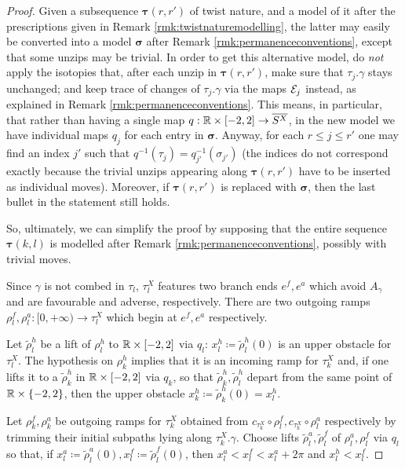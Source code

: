 \begin{proof}
Given a subsequence $\bm\tau(r,r')$ of twist nature, and a model of it after the prescriptions given in Remark \ref{rmk:twistnaturemodelling}, the latter may easily be converted into a model $\bm\sigma$ after Remark \ref{rmk:permanenceconventions}, except that some unzips may be trivial. In order to get this alternative model, do \emph{not} apply the isotopies that, after each unzip in $\bm\tau(r,r')$, make sure that $\tau_j.\gamma$ stays unchanged; and keep trace of changes of $\tau_j.\gamma$ via the maps $\mathcal{E}_j$ instead, as explained in Remark \ref{rmk:permanenceconventions}. This means, in particular, that rather than having a single map $q:\mathbb R\times[-2,2]\rightarrow \overline{S^X}$, in the new model we have individual maps $q_j$ for each entry in $\bm\sigma$. Anyway, for each $r\leq j\leq r'$ one may find an index $j'$ such that $q^{-1}(\tau_j)=q_{j'}^{-1}(\sigma_{j'})$ (the indices do not correspond exactly because the trivial unzips appearing along $\bm\tau(r,r')$ have to be inserted as individual moves). Moreover, if $\bm\tau(r,r')$ is replaced with $\bm\sigma$, then the last bullet in the statement still holds.

So, ultimately, we can simplify the proof by supposing that the entire sequence $\bm\tau(k,l)$ is modelled after Remark \ref{rmk:permanenceconventions}, possibly with trivial moves.

Since $\gamma$ is not combed in $\tau_l$, $\tau_l^X$ features two branch ends $e^f,e^a$ which avoid $A_\gamma$ and are favourable and adverse, respectively. There are two outgoing ramps $\rho_l^f,\rho_l^a:[0,+\infty)\rightarrow \tau_l^X$ which begin at $e^f,e^a$ respectively.

Let $\tilde\rho_l^h$ be a lift of $\rho_l^h$ to $\mathbb R\times[-2,2]$ via $q_l$: $x_l^h\coloneqq \tilde\rho_l^h(0)$ is an upper obstacle for $\tau_l^X$. The hypothesis on $\rho_k^h$ implies that it is an incoming ramp for $\tau_k^X$ and, if one lifts it to a $\tilde\rho_k^h$ in $\mathbb R\times[-2,2]$ via $q_k$, so that $\tilde\rho_k^h,\tilde\rho_l^h$ depart from the same point of $\mathbb R\times\{-2,2\}$, then the upper obstacle $x_k^h\coloneqq\tilde\rho_k^h(0)=x_l^h$.

Let $\rho_k^f,\rho_k^a$ be outgoing ramps for $\tau_k^X$ obtained from $c_{\tau_k^X}\circ\rho_l^f,c_{\tau_k^X}\circ\rho_l^a$ respectively by trimming their initial subpaths lying along $\tau_k^X.\gamma$. Choose lifts $\tilde\rho_l^a,\tilde\rho_l^f$ of $\rho_l^a,\rho_l^f$ via $q_l$ so that, if $x_l^a\coloneqq\tilde\rho_l^a(0),x_l^f\coloneqq\tilde\rho_l^f(0)$, then $x_l^a<x_l^f<x_l^a+2\pi$ and $x_l^h<x_l^f$.


\end{proof}

